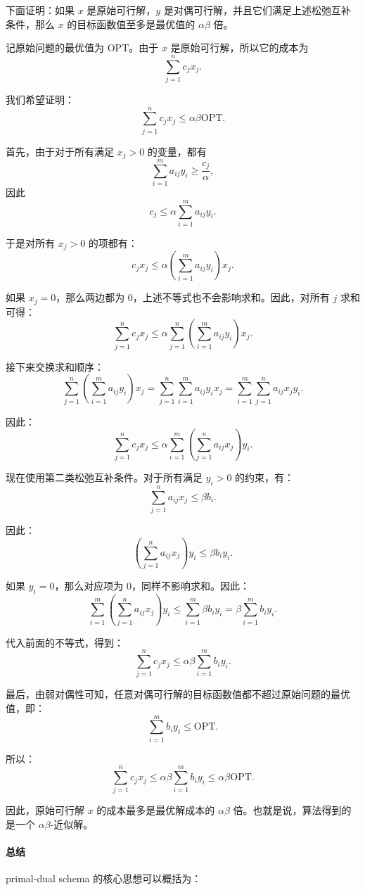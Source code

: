 \documentclass[UTF8,openany,12pt]{ctexbook}
\theoremstyle{remark}
\newcommand{\OPT}{\mathrm{OPT}}
\begin{document}
下面证明：如果 $x$ 是原始可行解，$y$ 是对偶可行解，并且它们满足上述松弛互补条件，那么 $x$ 的目标函数值至多是最优值的 $\alpha\beta$ 倍。

记原始问题的最优值为 $\OPT$。由于 $x$ 是原始可行解，所以它的成本为
\[
\sum_{j=1}^n c_jx_j.
\]

我们希望证明：
\[
\sum_{j=1}^n c_jx_j\le \alpha\beta\OPT.
\]

首先，由于对于所有满足 $x_j>0$ 的变量，都有
\[
\sum_{i=1}^m a_{ij}y_i\ge \frac{c_j}{\alpha},
\]
因此
\[
c_j\le \alpha\sum_{i=1}^m a_{ij}y_i.
\]

于是对所有 $x_j>0$ 的项都有：
\[
c_jx_j
\le
\alpha\left(\sum_{i=1}^m a_{ij}y_i\right)x_j.
\]

如果 $x_j=0$，那么两边都为 $0$，上述不等式也不会影响求和。因此，对所有 $j$ 求和可得：
\[
\sum_{j=1}^n c_jx_j
\le
\alpha\sum_{j=1}^n
\left(\sum_{i=1}^m a_{ij}y_i\right)x_j.
\]

接下来交换求和顺序：
\[
\sum_{j=1}^n
\left(\sum_{i=1}^m a_{ij}y_i\right)x_j
=
\sum_{j=1}^n
\sum_{i=1}^m a_{ij}y_ix_j
=
\sum_{i=1}^m
\sum_{j=1}^n a_{ij}x_jy_i.
\]

因此：
\[
\sum_{j=1}^n c_jx_j
\le
\alpha
\sum_{i=1}^m
\left(\sum_{j=1}^n a_{ij}x_j\right)y_i.
\]

现在使用第二类松弛互补条件。对于所有满足 $y_i>0$ 的约束，有：
\[
\sum_{j=1}^n a_{ij}x_j
\le
\beta b_i.
\]

因此：
\[
\left(\sum_{j=1}^n a_{ij}x_j\right)y_i
\le
\beta b_iy_i.
\]

如果 $y_i=0$，那么对应项为 $0$，同样不影响求和。因此：
\[
\sum_{i=1}^m
\left(\sum_{j=1}^n a_{ij}x_j\right)y_i
\le
\sum_{i=1}^m \beta b_iy_i
=
\beta\sum_{i=1}^m b_iy_i.
\]

代入前面的不等式，得到：
\[
\sum_{j=1}^n c_jx_j
\le
\alpha\beta
\sum_{i=1}^m b_iy_i.
\]

最后，由弱对偶性可知，任意对偶可行解的目标函数值都不超过原始问题的最优值，即：
\[
\sum_{i=1}^m b_iy_i\le \OPT.
\]

所以：
\[
\sum_{j=1}^n c_jx_j
\le
\alpha\beta
\sum_{i=1}^m b_iy_i
\le
\alpha\beta\OPT.
\]

因此，原始可行解 $x$ 的成本最多是最优解成本的 $\alpha\beta$ 倍。也就是说，算法得到的是一个 $\alpha\beta$-近似解。

\paragraph{总结}

primal-dual schema 的核心思想可以概括为：
\end{document}
